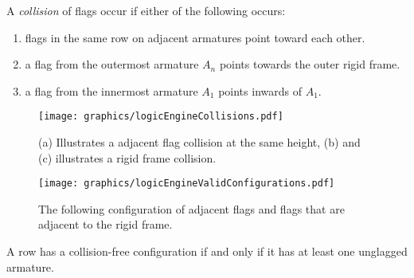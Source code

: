 A \textit{collision} of flags occur if either of the following occurs:
\begin{enumerate}
\item flags in the same row on adjacent armatures point toward each other.
\item a flag from the outermost armature $A_n$ points towards the outer rigid frame.
\item a flag from the innermost armature $A_1$ points inwards of $A_1$.
\end{enumerate}
\begin{figure}[!htbp]
\begin{center}
\texttt{[image: graphics/logicEngineCollisions.pdf]}
\caption{(a) Illustrates a adjacent flag collision at the same height, (b) and (c) illustrates a 
rigid frame collision.}\label{fig:logicEngineCollisions.pdf}
\end{center}

\end{figure}
\begin{figure}[!htbp]
\begin{center}
\texttt{[image: graphics/logicEngineValidConfigurations.pdf]}
\caption{The following configuration of adjacent flags 
and flags that are adjacent to the rigid frame.}\label{fig:logicEngineValidConfigurations.pdf}
\end{center}
\end{figure}
\begin{lem}\label{lem:logicEngine1}A row has a collision-free configuration if and only if it has 
at least one unglagged armature. \end{lem}
